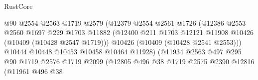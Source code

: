 \begin{lexlean}{RustCore}
\begin{coremodule}
                                          @90
                                          @2554
                                          @2563
                                          @1719
                                          @2579
                                          (@12379
                                            @2554
                                            @2561
                                            @1726
                                            (@12386
                                              @2553
                                              @2560
                                              @1697
                                              @229
                                              @1703
                                              @11882
                                              (@12400
                                                @211
                                                @1703
                                                @12121
                                                @11908
                                                @10426
                                                (@10409 (@10428 @2547 @1719)))
                                              @10426
                                              (@10409 (@10428 @2541 @2553)))
                                            @10444
                                            @10448
                                            @10453
                                            @10458
                                            @10464
                                            @11928)
                                          (@11934
                                            @2563
                                            @497
                                            @295
                                            @90
                                            @1719
                                            @2576
                                            @1719
                                            @2099
                                            (@12805
                                              @496
                                              @38
                                              @1719
                                              @2575
                                              @2390
                                              @12816
                                              (@11961
                                                @496
                                                @38

\end{coremodule}
\end{lexlean}
